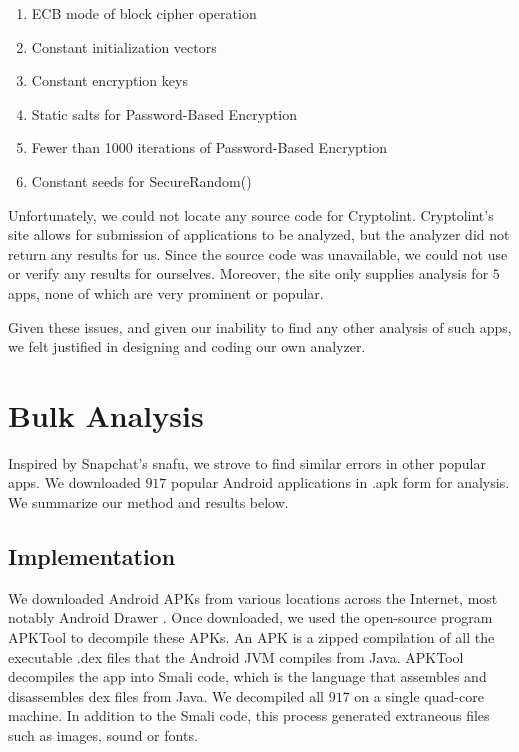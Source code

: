 \documentclass[11pt]{article}
\numberwithin{theorem}{subsection}
\begin{document}
\begin{enumerate}
  \item ECB mode of block cipher operation
  \item Constant initialization vectors
  \item Constant encryption keys
  \item Static salts for Password-Based Encryption
  \item Fewer than 1000 iterations of Password-Based Encryption
  \item Constant seeds for SecureRandom()
\end{enumerate}

Unfortunately, we could not locate any source code for Cryptolint. Cryptolint's site allows for submission of
applications to be analyzed, but the analyzer did not return any results for us.  Since the source code was unavailable, we could not use or verify any results for ourselves. Moreover, the site only supplies analysis for $5$ apps, 
none of which are very prominent or popular. 

Given these issues, and given our inability to find any other analysis of such apps, we felt justified in designing 
and coding our own analyzer.

\section{Bulk Analysis}

  Inspired by Snapchat's snafu, we strove to find similar errors in other popular apps. We downloaded
$917$ popular Android applications in .apk form for analysis. We summarize our method and results below.

\subsection{Implementation}

We downloaded Android APKs from various locations across the Internet, most notably Android Drawer \cite{AndroidDrawer}. Once downloaded, we used
the open-source program APKTool \cite{APKTool} to decompile these APKs. An APK is a zipped compilation of all the executable .dex files that the Android JVM compiles from Java. APKTool decompiles the app into Smali code, which is the language that assembles and disassembles dex files from Java.
We decompiled all $917$ on a single quad-core machine. In addition to the Smali code, this process generated extraneous files
such as images, sound or fonts. 
 
\end{document}
